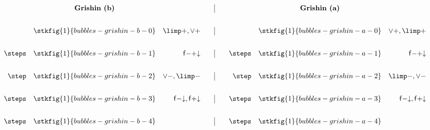 \setlength{\fboxsep}{2pt}
\setlength{\arraycolsep}{0pt}
\newcommand{\vsp}{\vspace{2em}}
$$
\begin{array}[t]{rcr@{\qquad}|@{\qquad}rcr@{\vsp}}
       &\text{\textbf{Grishin (b)}} &&
       &\text{\textbf{Grishin (a)}} & \\

       &\stkfig{1}{bubbles-grishin-b-0} &{\limp}{+}, {\lor}{+} &
       &\stkfig{1}{bubbles-grishin-a-0} &{\lor}{+}, {\limp}{+} \\

\steps &\stkfig{1}{bubbles-grishin-b-1} &{\mathsf{f{-}{+}{\downarrow}}} &
\steps &\stkfig{1}{bubbles-grishin-a-1} &{\mathsf{f{-}{+}{\downarrow}}} \\

\step  &\stkfig{1}{bubbles-grishin-b-2} &{\lor}{-}, {\limp}{-} &
\step  &\stkfig{1}{bubbles-grishin-a-2} &{\limp}{-}, {\lor}{-} \\

\steps &\stkfig{1}{bubbles-grishin-b-3} &\mathsf{f{-}{\downarrow}}, \mathsf{f{+}{\downarrow}} &
\steps &\stkfig{1}{bubbles-grishin-a-3} &\mathsf{f{-}{\downarrow}}, \mathsf{f{+}{\downarrow}} \\

\steps &\stkfig{1}{bubbles-grishin-b-4} & &
\steps &\stkfig{1}{bubbles-grishin-a-4} &
\end{array}
$$
